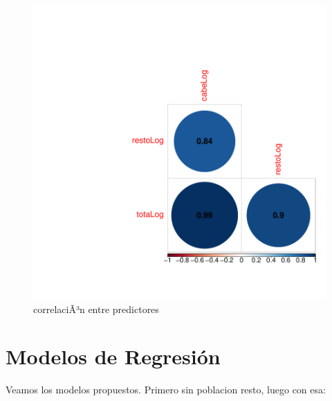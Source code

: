 \documentclass{article}
\begin{document}
\begin{figure}[h]
\centering
\begin{adjustbox}{width=7cm,height=7cm,clip,trim=1.5cm 0.5cm 0cm 1.5cm}
\includegraphics{EntregaFinal-corrPlotX}
\end{adjustbox}
\caption{correlaciÃ³n entre predictores}
\label{corrPlotX}
\end{figure}


\clearpage


 
\section{Modelos de Regresión}

Veamos los modelos propuestos. 
Primero sin poblacion resto, luego con esa:
\end{document}
